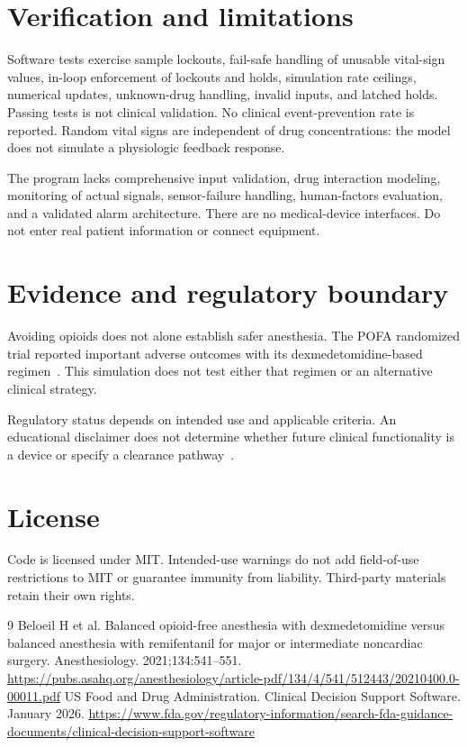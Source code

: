 \documentclass[11pt]{article}
\begin{document}
\section{Verification and limitations}
Software tests exercise sample lockouts, fail-safe handling of unusable vital-sign values, in-loop enforcement of lockouts and holds, simulation rate ceilings, numerical updates, unknown-drug handling, invalid inputs, and latched holds. Passing tests is not clinical validation. No clinical event-prevention rate is reported. Random vital signs are independent of drug concentrations: the model does not simulate a physiologic feedback response.

The program lacks comprehensive input validation, drug interaction modeling, monitoring of actual signals, sensor-failure handling, human-factors evaluation, and a validated alarm architecture. There are no medical-device interfaces. Do not enter real patient information or connect equipment.
\section{Evidence and regulatory boundary}
Avoiding opioids does not alone establish safer anesthesia. The POFA randomized trial reported important adverse outcomes with its dexmedetomidine-based regimen~\cite{pofa}. This simulation does not test either that regimen or an alternative clinical strategy.

Regulatory status depends on intended use and applicable criteria. An educational disclaimer does not determine whether future clinical functionality is a device or specify a clearance pathway~\cite{fda}.
\section{License}
Code is licensed under MIT. Intended-use warnings do not add field-of-use restrictions to MIT or guarantee immunity from liability. Third-party materials retain their own rights.
\begin{thebibliography}{9}
 Beloeil H et al. Balanced opioid-free anesthesia with dexmedetomidine versus balanced anesthesia with remifentanil for major or intermediate noncardiac surgery. Anesthesiology. 2021;134:541--551. \url{https://pubs.asahq.org/anesthesiology/article-pdf/134/4/541/512443/20210400.0-00011.pdf}
 US Food and Drug Administration. Clinical Decision Support Software. January 2026. \url{https://www.fda.gov/regulatory-information/search-fda-guidance-documents/clinical-decision-support-software}
\end{thebibliography}
\end{document}
